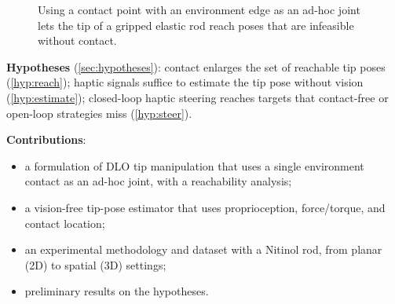 \begin{figure}[t]
  \centering
  \caption{Using a contact point with an environment edge as an ad-hoc joint
    lets the tip of a gripped elastic rod reach poses that are infeasible
    without contact.}
  \label{fig:teaser}
\end{figure}

\begin{outline}
  \item \textbf{Hypotheses} (\cref{sec:hypotheses}): contact enlarges the set
    of reachable tip poses (\ref{hyp:reach}); haptic signals suffice to estimate
    the tip pose without vision (\ref{hyp:estimate}); closed-loop haptic
    steering reaches targets that contact-free or open-loop strategies miss
    (\ref{hyp:steer}).
  \item \textbf{Contributions}:
    \begin{itemize}
      \item a formulation of DLO tip manipulation that uses a single
        environment contact as an ad-hoc joint, with a reachability analysis;
      \item a vision-free tip-pose estimator that uses proprioception,
        force/torque, and contact location;
      \item an experimental methodology and dataset with a Nitinol rod, from
        planar (2D) to spatial (3D) settings;
      \item preliminary results on the hypotheses.
    \end{itemize}
\end{outline}
